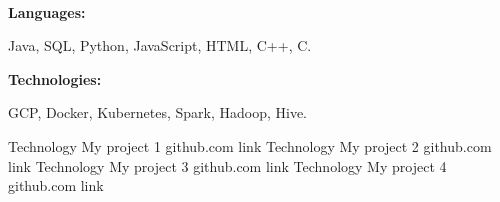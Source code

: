 \documentclass[9pt]{developercv} %
\begin{document}

\begin{minipage}[t]{0.46\textwidth}
	\vspace{-6pt}
 
	\lipsum[1][1-5] \\
\end{minipage}
\hfill %
\begin{minipage}[t]{0.465\textwidth}
    \vspace{-6pt}
    
    \begin{minipage}[t]{0.2\textwidth}
        \textbf{Languages:}
    \end{minipage}
    \hfill
    \begin{minipage}[t]{0.73\textwidth}
      Java, SQL, Python, JavaScript, HTML, C++, C.  
    \end{minipage}
    \vspace{4mm}
    
    \begin{minipage}[t]{0.2\textwidth}
        \textbf{Technologies:}
    \end{minipage}
    \hfill
    \begin{minipage}[t]{0.73\textwidth}
      GCP, Docker, Kubernetes, Spark, Hadoop, Hive.
    \end{minipage}
    
\end{minipage}

\begin{entrylist}
    \entry
		{Technology} %
		{My project 1} %
		{github.com link} %
		{%
        \lipsum[1][1-3]} %
    \entry
		{Technology}
		{My project 2}
		{github.com link}
		{%
        \lipsum[1][1-3]}
	\entry
		{Technology}
		{My project 3}
		{github.com link}
		{%
        \lipsum[1][1-3]}
    \entry
		{Technology}
		{My project 4}
		{github.com link}
		{%
        \lipsum[1][1-3]}
\end{entrylist}
\end{document}
